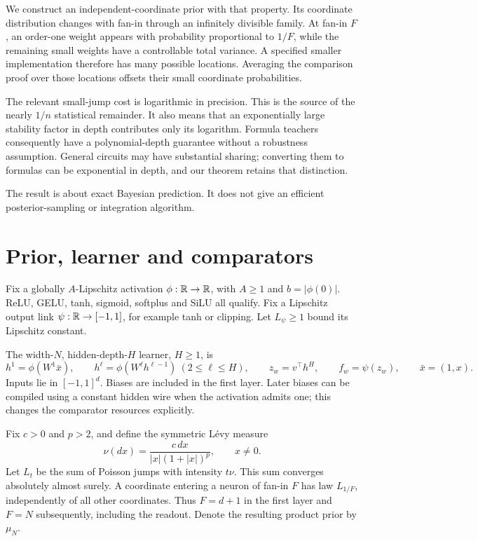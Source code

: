\documentclass[11pt]{article}
\theoremstyle{remark}\newtheorem{remark}[theorem]{Remark}
\begin{document}
We construct an independent-coordinate prior with that property. Its coordinate distribution changes with fan-in through an infinitely divisible family. At fan-in $F$, an order-one weight appears with probability proportional to $1/F$, while the remaining small weights have a controllable total variance. A specified smaller implementation therefore has many possible locations. Averaging the comparison proof over those locations offsets their small coordinate probabilities.

The relevant small-jump cost is logarithmic in precision. This is the source of the nearly $1/n$ statistical remainder. It also means that an exponentially large stability factor in depth contributes only its logarithm. Formula teachers consequently have a polynomial-depth guarantee without a robustness assumption. General circuits may have substantial sharing; converting them to formulas can be exponential in depth, and our theorem retains that distinction.

The result is about exact Bayesian prediction. It does not give an efficient posterior-sampling or integration algorithm.

\section{Prior, learner and comparators}
Fix a globally $A$-Lipschitz activation $\phi:\mathbb R\to\mathbb R$, with $A\ge1$ and $b=|\phi(0)|$. ReLU, GELU, tanh, sigmoid, softplus and SiLU all qualify. Fix a Lipschitz output link $\psi:\mathbb R\to[-1,1]$, for example tanh or clipping. Let $L_\psi\ge1$ bound its Lipschitz constant.

The width-$N$, hidden-depth-$H$ learner, $H\ge1$, is
\[
 h^1=\phi(W^1\bar x),\qquad
 h^\ell=\phi(W^\ell h^{\ell-1})\ (2\le\ell\le H),\qquad
 z_w=v^\top h^H,\qquad f_w=\psi(z_w),\qquad \bar x=(1,x).
\]
Inputs lie in $[-1,1]^d$. Biases are included in the first layer. Later biases can be compiled using a constant hidden wire when the activation admits one; this changes the comparator resources explicitly.

Fix $c>0$ and $p>2$, and define the symmetric L\'evy measure
\begin{equation}
 \nu(dx)=\frac{c\,dx}{|x|(1+|x|)^p},\qquad x\ne0.
 \label{eq:levy-measure}
\end{equation}
Let $L_t$ be the sum of Poisson jumps with intensity $t\nu$. This sum converges absolutely almost surely. A coordinate entering a neuron of fan-in $F$ has law $L_{1/F}$, independently of all other coordinates. Thus $F=d+1$ in the first layer and $F=N$ subsequently, including the readout. Denote the resulting product prior by $\mu_N$.
\end{document}

